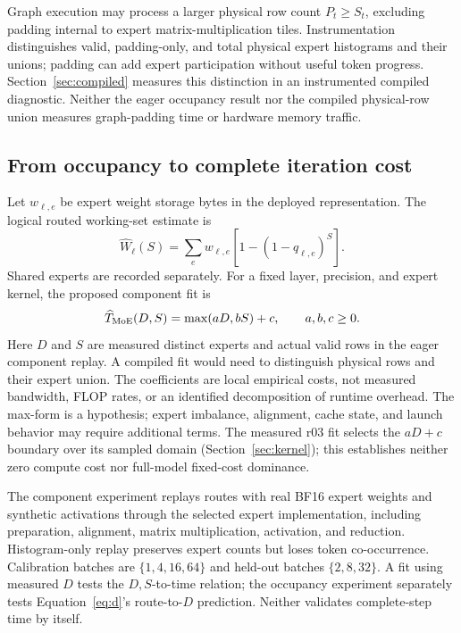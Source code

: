 \documentclass[10pt,twocolumn]{article}
\begin{document}
Graph execution may process a larger physical row count $P_t\geq S_t$, excluding padding internal to expert matrix-multiplication tiles. Instrumentation distinguishes valid, padding-only, and total physical expert histograms and their unions; padding can add expert participation without useful token progress. Section~\ref{sec:compiled} measures this distinction in an instrumented compiled diagnostic. Neither the eager occupancy result nor the compiled physical-row union measures graph-padding time or hardware memory traffic.

\subsection{From occupancy to complete iteration cost}
Let $w_{\ell,e}$ be expert weight storage bytes in the deployed representation. The logical routed working-set estimate is
\begin{equation}
\widehat W_\ell(S)=\sum_e w_{\ell,e}[1-(1-q_{\ell,e})^S].
\end{equation}
Shared experts are recorded separately. For a fixed layer, precision, and expert kernel, the proposed component fit is
\begin{equation}\label{eq:time}
\widehat T_{\rm MoE}(D,S)=\max(aD,bS)+c,\qquad a,b,c\geq0.
\end{equation}
Here $D$ and $S$ are measured distinct experts and actual valid rows in the eager component replay. A compiled fit would need to distinguish physical rows and their expert union. The coefficients are local empirical costs, not measured bandwidth, FLOP rates, or an identified decomposition of runtime overhead. The max-form is a hypothesis; expert imbalance, alignment, cache state, and launch behavior may require additional terms. The measured r03 fit selects the $aD+c$ boundary over its sampled domain (Section~\ref{sec:kernel}); this establishes neither zero compute cost nor full-model fixed-cost dominance.

The component experiment replays routes with real BF16 expert weights and synthetic activations through the selected expert implementation, including preparation, alignment, matrix multiplication, activation, and reduction. Histogram-only replay preserves expert counts but loses token co-occurrence. Calibration batches are $\{1,4,16,64\}$ and held-out batches $\{2,8,32\}$. A fit using measured $D$ tests the $D,S$-to-time relation; the occupancy experiment separately tests Equation~\ref{eq:d}'s route-to-$D$ prediction. Neither validates complete-step time by itself.
\end{document}
